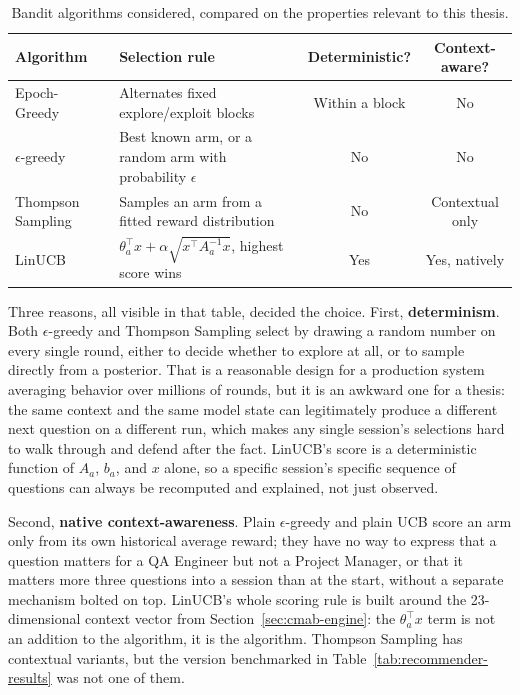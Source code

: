 \documentclass[a4paper, 12pt, oneside, openany, BCOR1cm,toc=chapterentrywithdots]{scrbook}
\begin{document}
\begin{table}[h]
\centering
\caption{Bandit algorithms considered, compared on the properties relevant to this thesis.}
\label{tab:algorithm-comparison}
\begin{tabular}{|l|p{4.3cm}|c|c|}
\hline
\textbf{Algorithm} & \textbf{Selection rule} & \textbf{Deterministic?} & \textbf{Context-aware?} \\
\hline
Epoch-Greedy~\cite{langford2007epochgreedy} & Alternates fixed explore/exploit
blocks & Within a block & No \\
\hline
$\epsilon$-greedy~\cite{tokic2011valuedifference} & Best known arm, or a
random arm with probability $\epsilon$ & No & No \\
\hline
Thompson Sampling~\cite{agrawal2013thompson} & Samples an arm from a fitted
reward distribution & No & Contextual only \\
\hline
LinUCB~\cite{li2010contextual,huang2016linucb} & $\theta_a^\top x + \alpha
\sqrt{x^\top A_a^{-1} x}$, highest score wins & Yes & Yes, natively \\
\hline
\end{tabular}
\end{table}

Three reasons, all visible in that table, decided the choice. First, \textbf{determinism}. Both
$\epsilon$-greedy and Thompson Sampling select by drawing a random number on every single round,
either to decide whether to explore at all, or to sample directly from a posterior. That is a
reasonable design for a production system averaging behavior over millions of rounds, but it is
an awkward one for a thesis: the same context and the same model state can legitimately produce
a different next question on a different run, which makes any single session's selections hard
to walk through and defend after the fact. LinUCB's score is a deterministic function of $A_a$,
$b_a$, and $x$ alone, so a specific session's specific sequence of questions can always be
recomputed and explained, not just observed.

Second, \textbf{native context-awareness}. Plain $\epsilon$-greedy and plain UCB score an arm
only from its own historical average reward; they have no way to express that a question matters
for a QA Engineer but not a Project Manager, or that it matters more three questions into a
session than at the start, without a separate mechanism bolted on top. LinUCB's whole scoring
rule is built around the 23-dimensional context vector from Section~\ref{sec:cmab-engine}: the
$\theta_a^\top x$ term is not an addition to the algorithm, it is the algorithm. Thompson
Sampling has contextual variants, but the version benchmarked in
Table~\ref{tab:recommender-results} was not one of them.
\end{document}
